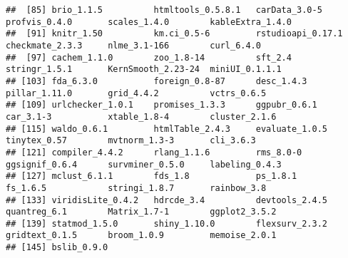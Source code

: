 \documentclass[
]{article}
\begin{document}
\begin{verbatim}
##  [85] brio_1.1.5          htmltools_0.5.8.1   carData_3.0-5       profvis_0.4.0       scales_1.4.0        kableExtra_1.4.0   
##  [91] knitr_1.50          km.ci_0.5-6         rstudioapi_0.17.1   checkmate_2.3.3     nlme_3.1-166        curl_6.4.0         
##  [97] cachem_1.1.0        zoo_1.8-14          sft_2.4             stringr_1.5.1       KernSmooth_2.23-24  miniUI_0.1.1.1     
## [103] fda_6.3.0           foreign_0.8-87      desc_1.4.3          pillar_1.11.0       grid_4.4.2          vctrs_0.6.5        
## [109] urlchecker_1.0.1    promises_1.3.3      ggpubr_0.6.1        car_3.1-3           xtable_1.8-4        cluster_2.1.6      
## [115] waldo_0.6.1         htmlTable_2.4.3     evaluate_1.0.5      tinytex_0.57        mvtnorm_1.3-3       cli_3.6.3          
## [121] compiler_4.4.2      rlang_1.1.6         rms_8.0-0           ggsignif_0.6.4      survminer_0.5.0     labeling_0.4.3     
## [127] mclust_6.1.1        fds_1.8             ps_1.8.1            fs_1.6.5            stringi_1.8.7       rainbow_3.8        
## [133] viridisLite_0.4.2   hdrcde_3.4          devtools_2.4.5      quantreg_6.1        Matrix_1.7-1        ggplot2_3.5.2      
## [139] statmod_1.5.0       shiny_1.10.0        flexsurv_2.3.2      gridtext_0.1.5      broom_1.0.9         memoise_2.0.1      
## [145] bslib_0.9.0
\end{verbatim}
\end{document}
